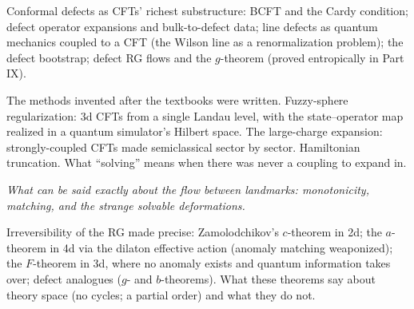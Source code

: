 Conformal defects as CFTs' richest substructure: BCFT and the Cardy condition; defect operator expansions and bulk-to-defect data; line defects as quantum mechanics coupled to a CFT (the Wilson line as a renormalization problem); the defect bootstrap; defect RG flows and the $g$-theorem (proved entropically in Part IX).

The methods invented after the textbooks were written. Fuzzy-sphere regularization: 3d CFTs from a single Landau level, with the state--operator map realized in a quantum simulator's Hilbert space. The large-charge expansion: strongly-coupled CFTs made semiclassical sector by sector. Hamiltonian truncation. What ``solving'' means when there was never a coupling to expand in.


\noin \emph{What can be said exactly about the flow between landmarks: monotonicity, matching, and the strange solvable deformations.}

Irreversibility of the RG made precise: Zamolodchikov's $c$-theorem in 2d; the $a$-theorem in 4d via the dilaton effective action (anomaly matching weaponized); the $F$-theorem in 3d, where no anomaly exists and quantum information takes over; defect analogues ($g$- and $b$-theorems). What these theorems say about theory space (no cycles; a partial order) and what they do not.

